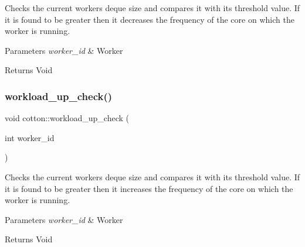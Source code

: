 Checks the current worker\textquotesingle{}s deque size and compares it with it\textquotesingle{}s threshold value. If it is found to be greater then it decreases the frequency of the core on which the worker is running.


\begin{DoxyParams}{Parameters}
{\em worker\+\_\+id} & Worker\\
\hline
\end{DoxyParams}
\begin{DoxyReturn}{Returns}
Void 
\end{DoxyReturn}
\mbox{\label{cotton-runtime_8h_file_aaffd00340decbd3395986d865ecc2660}} 
\subsubsection{\texorpdfstring{workload\+\_\+up\+\_\+check()}{workload\_up\_check()}}
{\footnotesize\ttfamily void cotton\+::workload\+\_\+up\+\_\+check (\begin{DoxyParamCaption}\item[{int}]{worker\+\_\+id }\end{DoxyParamCaption})}

Checks the current worker\textquotesingle{}s deque size and compares it with it\textquotesingle{}s threshold value. If it is found to be greater then it increases the frequency of the core on which the worker is running.


\begin{DoxyParams}{Parameters}
{\em worker\+\_\+id} & Worker\\
\hline
\end{DoxyParams}
\begin{DoxyReturn}{Returns}
Void 
\end{DoxyReturn}

